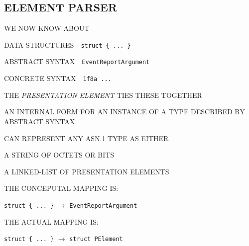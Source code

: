 \begin{bwslide}
\part*	{ELEMENT PARSER}\bf

\begin{nrtc}
\item	WE NOW KNOW ABOUT
    \begin{nrtc}
    \item	DATA STRUCTURES\ \ \verb"struct { ... }"

    \item	ABSTRACT SYNTAX\ \ \verb"EventReportArgument"

    \item	CONCRETE SYNTAX\ \ \verb"1f8a ..."
    \end{nrtc}

\item	THE \emph{PRESENTATION ELEMENT} TIES THESE TOGETHER
\end{nrtc}
\end{bwslide}


\begin{bwslide}

\begin{nrtc}
\item	AN INTERNAL FORM FOR AN INSTANCE OF A TYPE DESCRIBED BY ABSTRACT
	SYNTAX

\item	CAN REPRESENT ANY ASN.1 TYPE AS EITHER
    \begin{nrtc}
    \item	A STRING OF OCTETS OR BITS

    \item	A LINKED-LIST OF PRESENTATION ELEMENTS
    \end{nrtc}

\item	THE CONCEPUTAL MAPPING IS:
    \begin{nrtc}
    \item	\verb"struct { ... }" $\rightarrow$ \verb"EventReportArgument"
    \end{nrtc}

\item	THE ACTUAL MAPPING IS:
    \begin{nrtc}
    \item	\verb"struct { ... }" $\rightarrow$ \verb"struct PElement"
    \end{nrtc}
\end{nrtc}
\end{bwslide}


